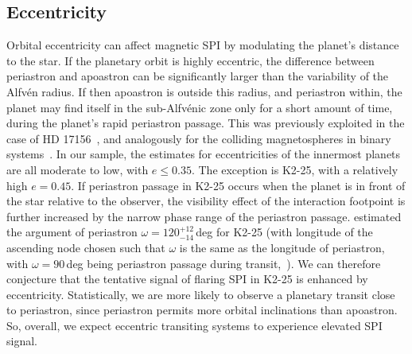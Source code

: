 \documentclass[twocolumn]{aastex631}
\begin{document}
\subsection{Eccentricity}
\label{sec:discussion:eccentricity}
Orbital eccentricity can affect magnetic SPI by modulating the planet's distance to the star. If the planetary orbit is highly eccentric, the difference between periastron and apoastron can be significantly larger than the variability of the Alfv\'en radius. If then apoastron is outside this radius, and periastron within, the planet may find itself in the sub-Alfv\'enic zone only for a short amount of time, during the planet's rapid periastron passage. This was previously exploited in the case of HD 17156~\citep{maggio2015coordinated}, and analogously for the colliding magnetospheres in binary systems~\citep{massi2002periodic,getman2016search}. In our sample, the estimates for eccentricities of the innermost planets are all moderate to low, with $e\leq 0.35$. The exception is K2-25, with a relatively high $e=0.45$. If periastron passage in K2-25 occurs when the planet is in front of the star relative to the observer, the visibility effect of the interaction footpoint is further increased by the narrow phase range of the periastron passage. \citet{stefansson2020habitable} estimated the argument of periastron $\omega=120^{+12}_{-14}\,$deg for K2-25 (with longitude of the ascending node chosen such that $\omega$ is the same as the longitude of periastron, with $\omega=90\,$deg being periastron passage during transit,~\citealt{kipping2010investigations,dawson2012photoeccentric}). We can therefore conjecture that the tentative signal of flaring SPI in K2-25 is enhanced by eccentricity. Statistically, we are more likely to observe a planetary transit close to periastron, since periastron permits more orbital inclinations than apoastron. So, overall, we expect eccentric transiting systems to experience elevated SPI signal.

\end{document}
